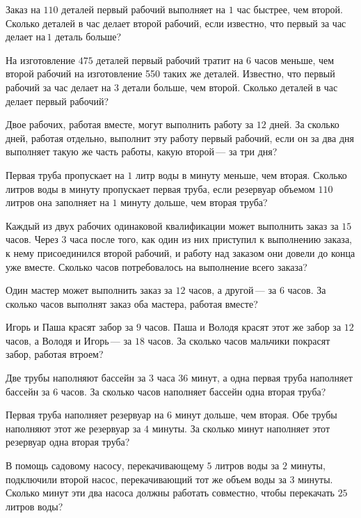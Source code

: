 \begin{class}[number=5]
	\begin{listofex}
		\item Заказ на \(110\) деталей первый рабочий выполняет на \(1\) час быстрее, чем второй. Сколько деталей в час делает второй рабочий, если известно, что первый за час делает на \(1\) деталь больше?
		\item На изготовление \(475\) деталей первый рабочий тратит на 6 часов меньше, чем второй рабочий на изготовление 550 таких же деталей. Известно, что первый рабочий за час делает на 3 детали больше, чем второй. Сколько деталей в час делает первый рабочий?
		\item Двое рабочих, работая вместе, могут выполнить работу за \(12\) дней. За сколько дней, работая отдельно, выполнит эту работу первый рабочий, если он за два дня выполняет такую же часть работы, какую второй --- за три дня?
		\item Первая труба пропускает на \(1\) литр воды в минуту меньше, чем вторая. Сколько литров воды в минуту пропускает первая труба, если резервуар объемом \(110\) литров она заполняет на \(1\) минуту дольше, чем вторая труба?
		\item Каждый из двух рабочих одинаковой квалификации может выполнить заказ за \(15\) часов. Через \(3\) часа после того, как один из них приступил к выполнению заказа, к нему присоединился второй рабочий, и работу над заказом они довели до конца уже вместе. Сколько часов потребовалось на выполнение всего заказа?
		\item Один мастер может выполнить заказ за \(12\) часов, а другой --- за \(6\) часов. За сколько часов выполнят заказ оба мастера, работая вместе?
		\item Игорь и Паша красят забор за \(9\) часов. Паша и Володя красят этот же забор за \(12\) часов, а Володя и Игорь --- за \(18\) часов. За сколько часов мальчики покрасят забор, работая втроем?
		\item Две трубы наполняют бассейн за \(3\) часа \(36\) минут, а одна первая труба наполняет бассейн за \(6\) часов. За сколько часов наполняет бассейн одна вторая труба?
		\item Первая труба наполняет резервуар на \(6\) минут дольше, чем вторая. Обе трубы наполняют этот же резервуар за \(4\) минуты. За сколько минут наполняет этот резервуар одна вторая труба?
		\item В помощь садовому насосу, перекачивающему \(5\) литров воды за \(2\) минуты, подключили второй насос, перекачивающий тот же объем воды за \(3\) минуты. Сколько минут эти два насоса должны работать совместно, чтобы перекачать \(25\) литров воды?

\end{listofex}
\end{class}
